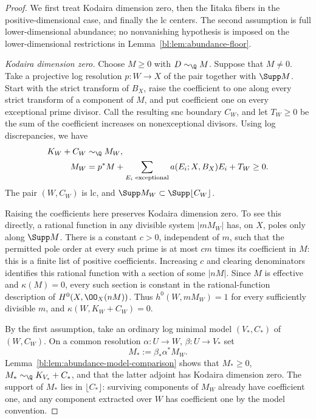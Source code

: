 \begin{proof}
We first treat Kodaira dimension zero, then the Iitaka fibers in
the positive-dimensional case, and finally the lc centers.  The
second assumption is full lower-dimensional abundance; no
nonvanishing hypothesis is imposed on the lower-dimensional
restrictions in Lemma~\ref{bl:lem:abundance-floor}.

\smallskip\noindent
\emph{Kodaira dimension zero.}
Choose $M\geq0$ with $D\sim_{\Q}M$.  Suppose that $M\ne0$.
Take a projective log resolution $p:W\to X$ of the pair together
with $\Supp M$.  Start with the strict transform of $B_X$, raise
the coefficient to one along every strict transform of a component
of $M$, and put coefficient one on every exceptional prime divisor.
Call the resulting snc boundary $C_W$, and let $T_W\geq0$ be the
sum of the coefficient increases on nonexceptional divisors.
Using log discrepancies, we have
\begin{equation}
 \begin{split}
 K_W+C_W&\sim_{\Q}M_W,\\
 M_W&=p^*M+\sum_{E_i\text{ exceptional}}
       a(E_i;X,B_X)E_i+T_W\geq0.
 \end{split}
 \label{bl:eq:abundance-raised-boundary}
\end{equation}
The pair $(W,C_W)$ is lc, and
$\Supp M_W\subset\Supp\lfloor C_W\rfloor$.

Raising the coefficients here preserves Kodaira dimension zero.
To see this directly, a rational function in any divisible system
$|mM_W|$ has, on $X$, poles only along $\Supp M$.  There is a
constant $c>0$, independent of $m$, such that the permitted pole
order at every such prime is at most $cm$ times its coefficient
in $M$: this is a finite list of positive coefficients.  Increasing
$c$ and clearing denominators identifies this rational function
with a section of some $|nM|$.  Since $M$ is effective and
$\kappa(M)=0$, every such section is constant in the rational-function
description of $H^0(X,\OO_X(nM))$.  Thus
$h^0(W,mM_W)=1$ for every sufficiently divisible $m$, and
$\kappa(W,K_W+C_W)=0$.

By the first assumption, take an ordinary log minimal model
$(V_*,C_*)$ of $(W,C_W)$.  On a common resolution
$\alpha:U\to W$, $\beta:U\to V_*$ set
\[
 M_*:=\beta_*\alpha^*M_W.
\]
Lemma~\ref{bl:lem:abundance-model-comparison} shows that
$M_*\geq0$, $M_*\sim_{\Q}K_{V_*}+C_*$, and that the latter
adjoint has Kodaira dimension zero.  The support of $M_*$ lies
in $\lfloor C_*\rfloor$: surviving components of $M_W$ already
have coefficient one, and any component extracted over $W$ has
coefficient one by the model convention.


\end{proof}
